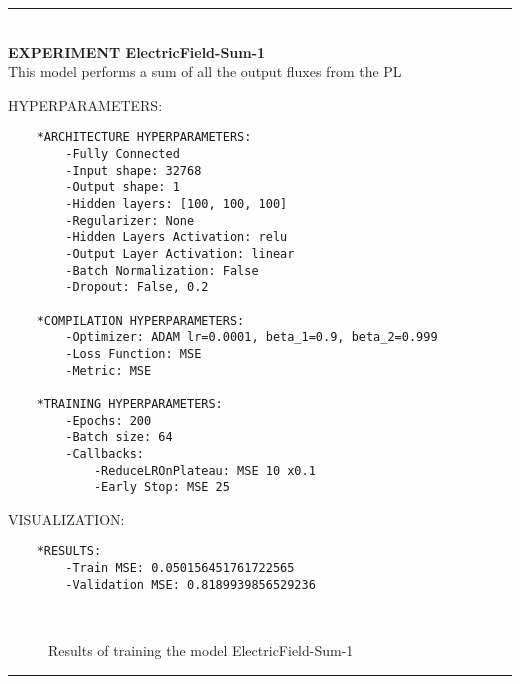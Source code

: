 \rule{0.5\textwidth}{0.5pt}\\

	{\large \textbf{EXPERIMENT ElectricField-Sum-1}}\\
	
		This model performs a sum of all the output fluxes from the PL
		
	{\normalsize HYPERPARAMETERS:}
	\begin{lstlisting}
	*ARCHITECTURE HYPERPARAMETERS:
		-Fully Connected
		-Input shape: 32768
		-Output shape: 1
		-Hidden layers: [100, 100, 100]
		-Regularizer: None
		-Hidden Layers Activation: relu
		-Output Layer Activation: linear
		-Batch Normalization: False
		-Dropout: False, 0.2
	
	*COMPILATION HYPERPARAMETERS:
		-Optimizer: ADAM lr=0.0001, beta_1=0.9, beta_2=0.999
		-Loss Function: MSE
		-Metric: MSE
	
	*TRAINING HYPERPARAMETERS:
		-Epochs: 200
		-Batch size: 64
		-Callbacks: 
			-ReduceLROnPlateau: MSE 10 x0.1
			-Early Stop: MSE 25
	\end{lstlisting}
	
	{\normalsize VISUALIZATION:}
	\begin{lstlisting}
    *RESULTS:
        -Train MSE: 0.050156451761722565
        -Validation MSE: 0.8189939856529236
	\end{lstlisting}
	
	\begin{figure*}[ht!]
		\hspace{\fill}
		\hspace{\fill}	
		\\
		\caption{Results of training the model ElectricField-Sum-1}
	\end{figure*}
	
\FloatBarrier	
\rule{0.5\textwidth}{0.5pt}\\